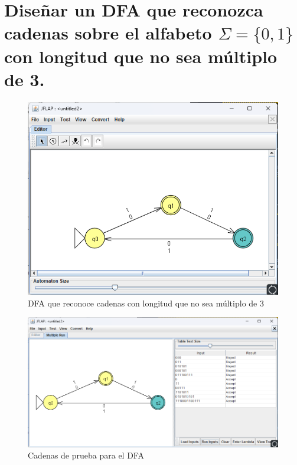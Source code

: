 \documentclass[11pt]{report}
\begin{document}
\newpage

\section{Diseñar un DFA que reconozca cadenas sobre el alfabeto $\Sigma = \{0, 1\}$ con longitud que no sea múltiplo de 3.}
\begin{figure}[H]
  \centering
  \includegraphics[scale=0.6]{img/DFA_09.png}
  \caption{DFA que reconoce cadenas con longitud que no sea múltiplo de 3}
\end{figure}

\begin{figure}[H]
  \centering
  \includegraphics[scale=0.65]{img/DFA_09_test.png}
  \caption{Cadenas de prueba para el DFA}
\end{figure}

\newpage
\end{document}
